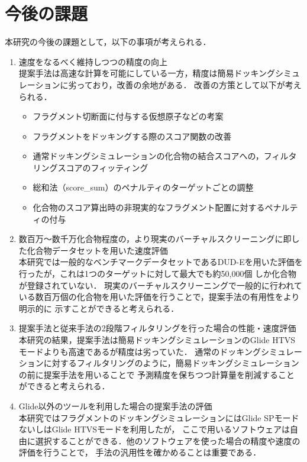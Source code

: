 \section{今後の課題}
本研究の今後の課題として，以下の事項が考えられる．
\begin{enumerate}
\item 速度をなるべく維持しつつの精度の向上\\
	提案手法は高速な計算を可能にしている一方，精度は簡易ドッキングシミュレーションに劣っており，改善の余地がある．
	改善の方策として以下が考えられる．
	\begin{itemize}
	\item フラグメント切断面に付与する仮想原子などの考案
	\item フラグメントをドッキングする際のスコア関数の改善
	\item 通常ドッキングシミュレーションの化合物の結合スコアへの，フィルタリングスコアのフィッティング
	\item 総和法（score\_sum）のペナルティのターゲットごとの調整
	\item 化合物のスコア算出時の非現実的なフラグメント配置に対するペナルティの付与
	\end{itemize}
\item 数百万～数千万化合物程度の，より現実のバーチャルスクリーニングに即した化合物データセットを用いた速度評価\\
	本研究では一般的なベンチマークデータセットであるDUD-Eを用いた評価を行ったが，これは1つのターゲットに対して最大でも約50,000個
	しか化合物が登録されていない．
	現実のバーチャルスクリーニングで一般的に行われている数百万個の化合物を用いた評価を行うことで，提案手法の有用性をより明示的に
	示すことができると考えられる．
\item 提案手法と従来手法の2段階フィルタリングを行った場合の性能・速度評価\\
	本研究の結果，提案手法は簡易ドッキングシミュレーションのGlide HTVSモードよりも高速であるが精度は劣っていた．
	通常のドッキングシミュレーションに対するフィルタリングのように，簡易ドッキングシミュレーションの前に提案手法を用いることで
	予測精度を保ちつつ計算量を削減することができると考えられる．
\item Glide以外のツールを利用した場合の提案手法の評価\\
	本研究ではフラグメントのドッキングシミュレーションにはGlide SPモードないしはGlide HTVSモードを利用したが，
	ここで用いるソフトウェアは自由に選択することができる．他のソフトウェアを使った場合の精度や速度の評価を行うことで，
	手法の汎用性を確かめることは重要である．
\end{enumerate}
